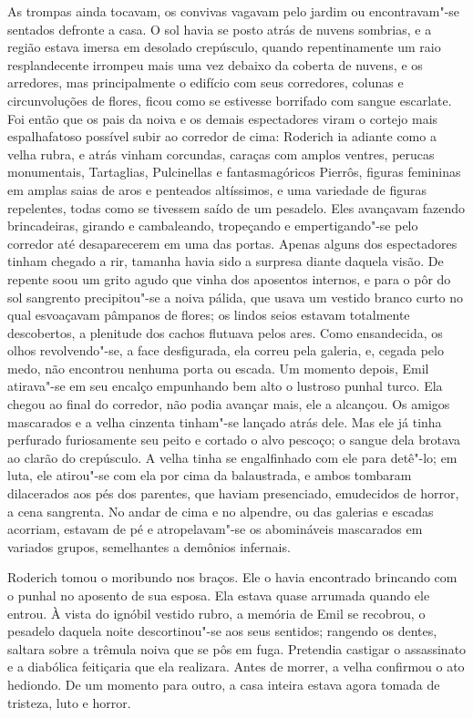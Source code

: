 As trompas ainda tocavam, os convivas vagavam pelo jardim ou
encontravam"-se sentados defronte a casa. O sol havia se posto atrás de
nuvens sombrias, e a região estava imersa em desolado crepúsculo,
quando repentinamente um raio resplandecente irrompeu mais uma vez
debaixo da coberta de nuvens, e os arredores, mas principalmente o
edifício com seus corredores, colunas e circunvoluções de flores, ficou
como se estivesse borrifado com sangue escarlate. Foi então que os pais
da noiva e os demais espectadores viram o cortejo mais espalhafatoso
possível subir ao corredor de cima: Roderich ia adiante como a velha
rubra, e atrás vinham corcundas, caraças com amplos ventres, perucas
monumentais, Tartaglias, Pulcinellas e fantasmagóricos
Pierrôs, figuras femininas em amplas saias de aros e
penteados altíssimos, e uma variedade de figuras repelentes, todas como
se tivessem saído de um pesadelo. Eles avançavam fazendo brincadeiras,
girando e cambaleando, tropeçando e empertigando"-se pelo corredor até
desaparecerem em uma das portas. Apenas alguns dos espectadores tinham
chegado a rir, tamanha havia sido a surpresa diante daquela visão. De
repente soou um grito agudo que vinha dos aposentos internos, e para o
pôr do sol sangrento precipitou"-se a noiva pálida, que usava um vestido
branco curto no qual esvoaçavam pâmpanos de flores; os lindos seios
estavam totalmente descobertos, a plenitude dos \mbox{cachos} flutuava pelos
ares. Como ensandecida, os olhos revolvendo"-se, a face desfigurada, ela
correu pela galeria, e, cegada pelo medo, não encontrou nenhuma porta
ou escada. Um momento depois, Emil atirava"-se em seu encalço empunhando
bem alto o lustroso punhal turco. Ela chegou ao final do corredor, não
podia avançar mais, ele a alcançou. Os amigos mascarados e a velha
cinzenta tinham"-se lançado atrás dele. Mas ele já tinha perfurado
furiosamente seu peito e cortado o alvo pescoço; o sangue dela brotava
ao clarão do crepúsculo. A velha tinha se engalfinhado com ele para
detê"-lo; em luta, ele atirou"-se com ela por cima da balaustrada, e
ambos tombaram dilacerados aos pés dos parentes, que haviam
presenciado, emudecidos de horror, a cena sangrenta. No andar de cima e
no alpendre, ou das galerias e escadas acorriam, estavam de pé e
atropelavam"-se os abomináveis mascarados em variados grupos,
semelhantes a demônios infernais.

Roderich tomou o moribundo nos braços. Ele o havia encontrado brincando
com o punhal no aposento de sua esposa. Ela estava quase arrumada
quando ele entrou. À vista do ignóbil vestido rubro, a memória de Emil		\EP[-1]
se recobrou, o pesadelo daquela noite descortinou"-se aos seus sentidos;
rangendo os dentes, saltara sobre a trêmula noiva que se pôs em fuga.
Pretendia castigar o assassinato e a diabólica feitiçaria que
ela realizara. Antes de morrer, a velha confirmou o ato hediondo. De um
momento para outro, a casa inteira estava agora tomada de tristeza, luto e horror.
\medskip

